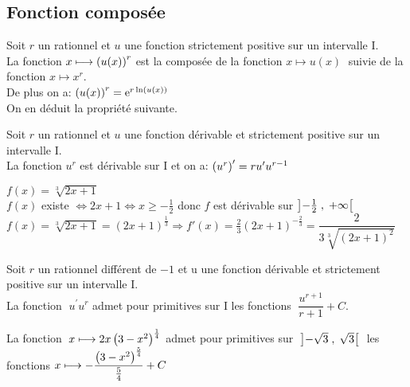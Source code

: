  \subsection{Fonction composée}
Soit $r $ un rationnel  et $u$  une fonction strictement positive sur un intervalle I. \\
La fonction \; $ x\longmapsto \left(u(x)\right)^{r} $\; est la composée de la fonction $ x\longmapsto u(x) \;$  suivie de la fonction  \; $ x \longmapsto  x^{r} $.\\
 De plus on a:\; $ \left(u(x)\right)^{r}=\mathrm{e}^{r\ln (u(x))} $\\
On en déduit la propriété suivante.

\begin{property}
Soit $r $ un rationnel et  $u$  une fonction  dérivable et strictement positive sur un intervalle I. \\La fonction \;$ u^{r} $\; est dérivable sur I et on a:\; $\left( u^{r}\right)^{\prime}=r u^{\prime}u^{r -1} $
\end{property}
 \begin{example}
 $ f(x)= \sqrt[3]{2x+1} $\\
 $ f(x) $  existe $ \Leftrightarrow 2x+1 \Leftrightarrow x \geq -\frac{1}{2} $ donc $ f $ est dérivable sur $ \left]-\frac{1}{2} \;,\; +\infty\right[ $\\
  $ f(x)= \sqrt[3]{2x+1}=(2x+1)^{\frac{1}{3}}\Longrightarrow f'(x)=\frac{2}{3}(2x+1)^{-\frac{2}{3}}=\dfrac{2}{3\sqrt[3]{(2x+1)^2}} $
 \end{example}

\begin{corollary}
Soit $r $ un rationnel  différent de \;$ -1 $\;   et  u  une fonction  dérivable et  strictement positive sur un intervalle I. \\La fonction  $ \;                                       u^{\prime}u^{r} $\;   admet pour primitives sur I les fonctions   $ \;                                      \dfrac{u^{r +1}}{r+1} +C$.

\end{corollary}
\begin{example}
La fonction $ \; x\longmapsto 2x \left(3-x^{2}\right)^{\frac{1}{4}} $   admet pour primitives sur $ \;\left]-\sqrt{3} \;,\; \sqrt{3}\right[ \;$ les fonctions  $ x\longmapsto -\dfrac{\left(3-x^{2}\right)^{\frac{5}{4}}}{\frac{5}{4}} +C$
\end{example}


